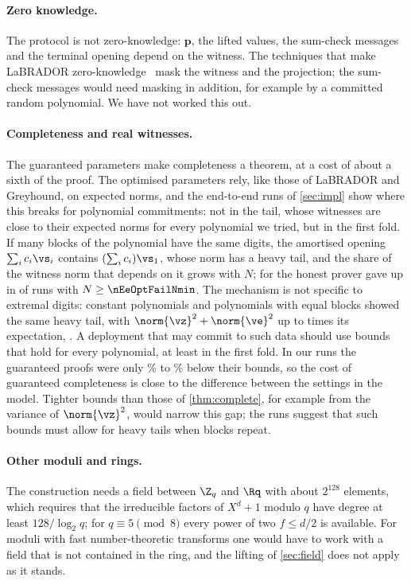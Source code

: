 \paragraph{Zero knowledge.}
The protocol is not zero-knowledge: $\mathbf p$, the lifted values, the sum-check messages and the terminal opening depend on the witness. The techniques that make LaBRADOR zero-knowledge~\cite{BS23,BBLMOSS26} mask the witness and the projection; the sum-check messages would need masking in addition, for example by a committed random polynomial. We have not worked this out.

\paragraph{Completeness and real witnesses.}
The guaranteed parameters make completeness a theorem, at a cost of about a sixth of the proof. The optimised parameters rely, like those of LaBRADOR and Greyhound, on expected norms, and the end-to-end runs of \cref{sec:impl} show where this breaks for polynomial commitments: not in the tail, whose witnesses are close to their expected norms for every polynomial we tried, but in the first fold. If many blocks of the polynomial have the same digits, the amortised opening $\sum_ic_i\vs_i$ contains $(\sum_ic_i)\vs_1$, whose norm has a heavy tail, and the share of the witness norm that depends on it grows with $N$; for \nEeOptFailKindText{} the honest prover gave up in \nEeOptFails{} of \nEeOptFailKindRuns{} runs with $N\ge\nEeOptFailNmin$. The mechanism is not specific to extremal digits: constant polynomials and polynomials with equal blocks showed the same heavy tail, with $\norm{\vz}^2+\norm{\ve}^2$ up to \nEeZeConstMax{} times its expectation, \nEeConstFailText. A deployment that may commit to such data should use bounds that hold for every polynomial, at least in the first fold. In our runs the guaranteed proofs were only \nEeGcBelowLo\% to \nEeGcBelowHi\% below their bounds, so the cost of guaranteed completeness is close to the difference between the settings in the model. Tighter bounds than those of \cref{thm:complete}, for example from the variance of $\norm{\vz}^2$, would narrow this gap; the runs suggest that such bounds must allow for heavy tails when blocks repeat.

\paragraph{Other moduli and rings.}
The construction needs a field between $\Z_q$ and $\Rq$ with about $2^{128}$ elements, which requires that the irreducible factors of $X^d+1$ modulo $q$ have degree at least $128/\log_2q$; for $q\equiv5\pmod8$ every power of two $f\le d/2$ is available. For moduli with fast number-theoretic transforms one would have to work with a field that is not contained in the ring, and the lifting of \cref{sec:field} does not apply as it stands.
